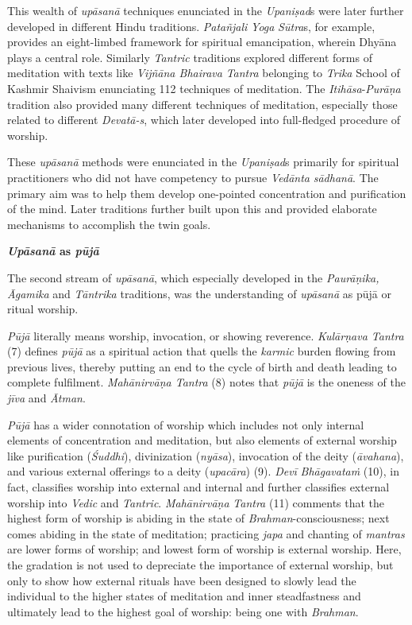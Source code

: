 This wealth of \emph{upāsanā} techniques enunciated in the \emph{Upaniṣad}s were later further developed in different Hindu traditions. \emph{Patañjali} \emph{Yoga} \emph{Sūtra}s, for example, provides an eight-limbed framework for spiritual emancipation, wherein Dhyāna plays a central role. Similarly \emph{Tantric} traditions explored different forms of meditation with texts like \emph{Vijñāna Bhairava} \emph{Tantra} belonging to \emph{Trika} School of Kashmir Shaivism enunciating 112 techniques of meditation. The \emph{Itihāsa}-\emph{Purāṇa} tradition also provided many different techniques of meditation, especially those related to different \emph{Devatā-s}, which later developed into full-fledged procedure of worship.

These \emph{upāsanā} methods were enunciated in the \emph{Upaniṣad}s primarily for spiritual practitioners who did not have competency to pursue \emph{Vedānta} \emph{sādhanā}. The primary aim was to help them develop one-pointed concentration and purification of the mind. Later traditions further built upon this and provided elaborate mechanisms to accomplish the twin goals.

\textbf{\emph{Upāsanā} as \emph{pūjā}}

The second stream of \emph{upāsanā}, which especially developed in the \emph{Paurāṇika, Āgamika} and \emph{Tāntrika} traditions, was the understanding of \emph{upāsanā} as pūjā or ritual worship.

\emph{Pūjā} literally means worship, invocation, or showing reverence. \emph{Kulārṇava Tantra} (7) defines \emph{pūjā} as a spiritual action that quells the \emph{karmic} burden flowing from previous lives, thereby putting an end to the cycle of birth and death leading to complete fulfilment. \emph{Mahānirvāṇa Tantra} (8) notes that \emph{pūjā} is the oneness of the \emph{jīva} and \emph{Ātman}.

\emph{Pūjā} has a wider connotation of worship which includes not only internal elements of concentration and meditation, but also elements of external worship like purification (\emph{Śuddhi}), divinization (\emph{nyāsa}), invocation of the deity (\emph{āvahana}), and various external offerings to a deity (\emph{upacāra}) (9). \emph{Devī} \emph{Bhāgavataṁ} (10), in fact, classifies worship into external and internal and further classifies external worship into \emph{Vedic} and \emph{Tantric}. \emph{Mahānirvāṇa} \emph{Tantra} (11) comments that the highest form of worship is abiding in the state of \emph{Brahman}-consciousness; next comes abiding in the state of meditation; practicing \emph{japa} and chanting of \emph{mantras} are lower forms of worship; and lowest form of worship is external worship. Here, the gradation is not used to depreciate the importance of external worship, but only to show how external rituals have been designed to slowly lead the individual to the higher states of meditation and inner steadfastness and ultimately lead to the highest goal of worship: being one with \emph{Brahman}.


